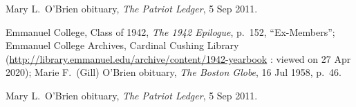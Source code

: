 \begin{thebibliography}{999}
Mary L.\ O'Brien obituary, \textit{The Patriot Ledger}, 5 Sep 2011.

Emmanuel College, Class of 1942, \textit{The 1942 Epilogue}, p.\ 152, ``Ex-Members''; Emmanuel College Archives, Cardinal Cushing Library (\url{http://library.emmanuel.edu/archive/content/1942-yearbook} : viewed on 27 Apr 2020); Marie F.\ (Gill) O'Brien obituary, \textit{The Boston Globe}, 16 Jul 1958, p.\ 46.

Mary L.\ O'Brien obituary, \textit{The Patriot Ledger}, 5 Sep 2011.
	
\end{thebibliography}